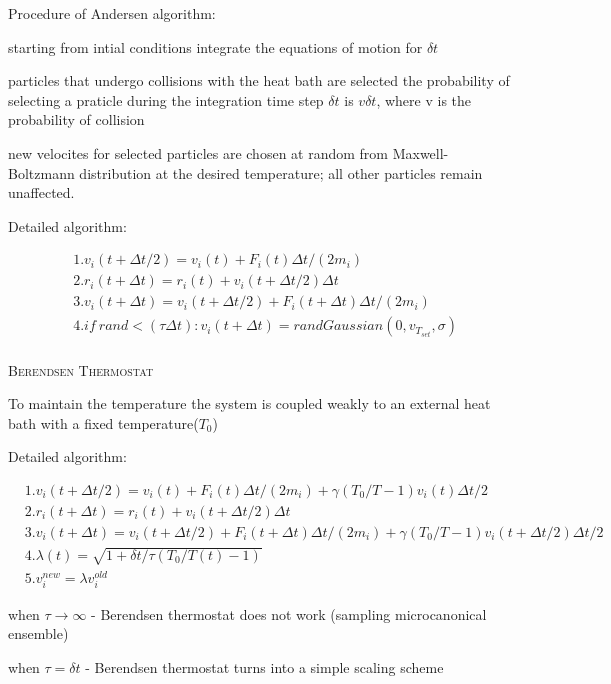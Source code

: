 \documentclass{article}
\begin{document}
\begin{spacing}{1}
Procedure of Andersen algorithm:

starting from intial conditions integrate the equations of motion for $\delta t$

particles that undergo collisions with the heat bath are selected
the probability of selecting a praticle during the integration time step $\delta t$ is $v\delta t$, where v is the probability of collision

new velocites for selected particles are chosen at random from Maxwell- Boltzmann distribution at the desired temperature; all other particles remain unaffected.

Detailed algorithm:


$$\begin{aligned} 
& 1. v_{i}(t+\Delta t/2)=v_{i}(t)+F_{i}(t)\Delta t/(2m_i) \\ 
& 2. r_{i}(t+\Delta t)=r_{i}(t)+v_{i}(t+\Delta t/2)\Delta t \\ 
& 3. v_{i}(t+\Delta t)=v_{i}(t+\Delta t/2)+F_{i}(t+\Delta t)\Delta t/(2m_i) \\
& 4. if\ rand<(\tau \Delta t):v_{i}(t+\Delta t)=randGaussian(0, v_{T_{set}}, \sigma)\\ 
\end{aligned}$$


\vspace{1.5em}
\textsc{\Large Berendsen Thermostat}

To maintain the temperature the system is coupled weakly to an external heat bath with a fixed temperature($T_0$)

Detailed algorithm:

$$\begin{aligned} 
& 1. v_{i}(t+\Delta t/2)=v_{i}(t)+F_{i}(t)\Delta t/(2m_i)+\gamma(T_0/T-1)v_i(t)\Delta t/2 \\ 
& 2. r_{i}(t+\Delta t)=r_{i}(t)+v_{i}(t+\Delta t/2)\Delta t \\ 
& 3. v_{i}(t+\Delta t)=v_{i}(t+\Delta t/2)+F_{i}(t+\Delta t)\Delta t/(2m_i)+\gamma(T_0/T-1)v_i(t+\Delta t/2)\Delta t/2 \\
& 4. \lambda(t)=\sqrt{1+\delta t/\tau(T_0/T(t)-1)}\\ 
& 5. v_i^{new}=\lambda v_i^{old}
\end{aligned}$$

 
when $\tau \to \infty$ - Berendsen thermostat does not work (sampling microcanonical ensemble)

when $\tau = \delta t$ - Berendsen thermostat turns into a simple scaling scheme


\end{spacing}
\end{document}
